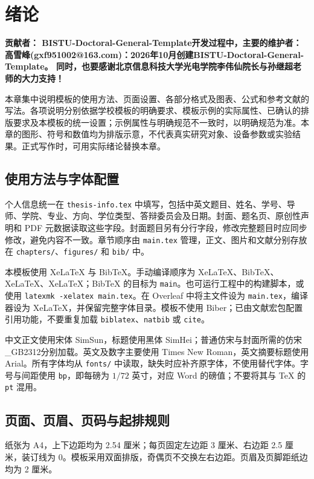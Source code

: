 \chapter{绪论}
\label{chap:introduction}

\textbf{贡献者：
BISTU-Doctoral-General-Template开发过程中，主要的维护者：
高雪峰(gxf951002@163.com)：2026年10月创建BISTU-Doctoral-General-Template。
同时，也要感谢北京信息科技大学光电学院李伟仙院长与孙继超老师的大力支持！}

本章集中说明模板的使用方法、页面设置、各部分格式及图表、公式和参考文献的写法。各项说明分别依据学校模板的明确要求、模板示例的实际属性、已确认的排版要求及本模板的统一设置；示例属性与明确规范不一致时，以明确规范为准。本章的图形、符号和数值均为排版示意，不代表真实研究对象、设备参数或实验结果。正式写作时，可用实际绪论替换本章。

\section{使用方法与字体配置}

个人信息统一在 \texttt{thesis-info.tex} 中填写，包括中英文题目、姓名、学号、导师、学院、专业、方向、学位类型、答辩委员会及日期。封面、题名页、原创性声明和 PDF 元数据读取这些字段。封面题目另有分行字段，修改完整题目时应同步修改，避免内容不一致。章节顺序由 \texttt{main.tex} 管理，正文、图片和文献分别存放在 \texttt{chapters/}、\texttt{figures/} 和 \texttt{bib/} 中。

本模板使用 XeLaTeX 与 BibTeX。手动编译顺序为 XeLaTeX、BibTeX、XeLaTeX、XeLaTeX；BibTeX 的目标为 \texttt{main}。也可运行工程中的构建脚本，或使用 \verb|latexmk -xelatex main.tex|。在 Overleaf 中将主文件设为 \texttt{main.tex}，编译器设为 XeLaTeX，并保留完整字体目录。模板不使用 Biber；已由文献宏包配置引用功能，不要重复加载 \texttt{biblatex}、\texttt{natbib} 或 \texttt{cite}。

中文正文使用宋体 SimSun，标题使用黑体 SimHei；普通仿宋与封面所需的仿宋\_GB2312分别加载。英文及数字主要使用 Times New Roman，英文摘要标题使用 Arial。所有字体均从 \texttt{fonts/} 中读取，缺失时应补齐原字体，不使用替代字体。字号与间距使用 \texttt{bp}，即每磅为 $1/72$ 英寸，对应 Word 的磅值；不要将其与 TeX 的 \texttt{pt} 混用。

\section{页面、页眉、页码与起排规则}

纸张为 A4，上下边距均为 2.54 厘米；每页固定左边距 3 厘米、右边距 2.5 厘米，装订线为 0。模板采用双面排版，奇偶页不交换左右边距。页眉及页脚距纸边均为 2 厘米。

